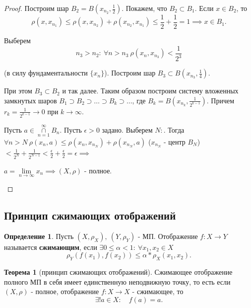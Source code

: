 \documentclass{report}
\theoremstyle{definition}
\newtheorem{definition}{Определение}[section]
\newtheorem{theorem}{Теорема}[section]
\begin{document}
\begin{proof}
  Построим шар $B_2 = B(x_{n_2},\frac{1}{2})$. Покажем, что
  $B_2 \subset B_1$. Если $x\in B_2$, то
  \begin{equation*}
    \rho (x,x_{n_1}) \leqslant \rho(x,x_{n_2}) + \rho (x_{n_2},
    x_{n_1}) \leqslant \frac{1}{2} + \frac{1}{2} = 1 \implies x \in B_1.
  \end{equation*}

  Выберем
  \begin{equation*}
    n_3 > n_2: \ \forall n > n_3 \ \rho(x_n,x_{n_3}) < \frac{1}{2^3}
  \end{equation*}

  (в силу фундаментальности $\{x_n\}$). Построим шар $B_3 \subset B(x_{n_3},\frac{1}{4})$.

  При этом $B_3 \subset B_2$ и так далее. Таким образом построим систему вложенных замкнутых шаров $B_1
    \supset B_2 \supset \ldots \supset B_k \supset \ldots$, где $B_k = B(x_{n_k},\frac{1}{2^{k-1}})$.
  Причем $r_k = \frac{1}{2^{k-1}} \rightarrow 0$ при $k \rightarrow \infty$.

  Пусть $a \in \underset{n=1}{\overset{\infty}{\cap}} B_n$. Пусть $\epsilon > 0$ задано. Выберем $N:$.
  Тогда $\forall n > N \ \rho(x_n,a)\leqslant \rho(x_n,x_{n_N}) + \rho(x_{n_N},a)$ ($x_{n_N}$ - центр $B_N$)
  $< \frac{1}{2^N} + \frac{1}{2^{N-1}} < \frac{\epsilon}{2} + \frac{\epsilon}{2} = \epsilon \implies$
  \begin{center}
    $a = \underset{n\rightarrow\infty}{\lim}x_n \implies (X,\rho)$ - полное.
  \end{center}
\end{proof}

\subsection{Принцип сжимающих отображений}

\begin{definition}
  Пусть $(X,\rho_X), \ (Y,\rho_Y)$ - МП. Отображение $f:X\rightarrow Y$ называется \textbf{сжимающим},
  если $\exists 0 \leqslant \alpha < 1: \ \forall x_1,x_2 \in X$
  \begin{equation*}
    \rho_Y(f(x_1),f(x_2)) \leqslant \alpha * \rho_X(x_1,x_2).
  \end{equation*}
\end{definition}

\begin{theorem}[принцип сжимающих отображений]
  Сжимающее отображение полного МП в себя имеет единственную неподвижную точку, то есть если
  $(X,\rho)$ - полное, отображение $f:X\rightarrow X$ - сжимающее, то
  \begin{equation*}
    \exists ! a \in X: \quad f(a) = a.
  \end{equation*}
\end{theorem}
\end{document}
